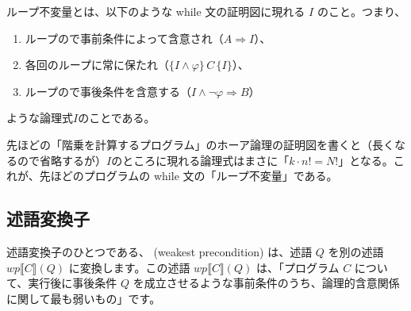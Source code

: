 \documentclass[
		head_space=20mm,
		foot_space=20mm,
		gutter=10mm,
		line_length=190mm
]{jlreq}
\begin{document}
\begin{remark}
	ループ不変量とは、以下のような while 文の証明図に現れる $I$ のこと。つまり、
	\begin{enumerate}
		\item ループので事前条件によって含意され（$A\Rightarrow I$）、
		\item 各回のループに常に保たれ（$\{I\land\varphi\}\,C\,\{I\}$）、
		\item ループので事後条件を含意する（$I\land\lnot\varphi\Rightarrow B$）
	\end{enumerate}
	ような論理式$I$のことである。\vspace{5pt}
	\begin{prooftree}
		 
		 
	\end{prooftree}\vspace{5pt}
	先ほどの「階乗を計算するプログラム」のホーア論理の証明図を書くと（長くなるので省略するが）$I$のところに現れる論理式はまさに「$k\cdot n!=N!$」となる。これが、先ほどのプログラムの while 文の「ループ不変量」である。
\end{remark}

\subsection{述語変換子}

述語変換子のひとつである、 (weakest precondition) は、述語 $Q$ を別の述語 $wp\llbracket C\rrbracket (Q)$ に変換します。この述語 $wp\llbracket C\rrbracket (Q)$ は、「プログラム $C$ について、実行後に事後条件 $Q$ を成立させるような事前条件のうち、論理的含意関係に関して最も弱いもの」です。
\end{document}
